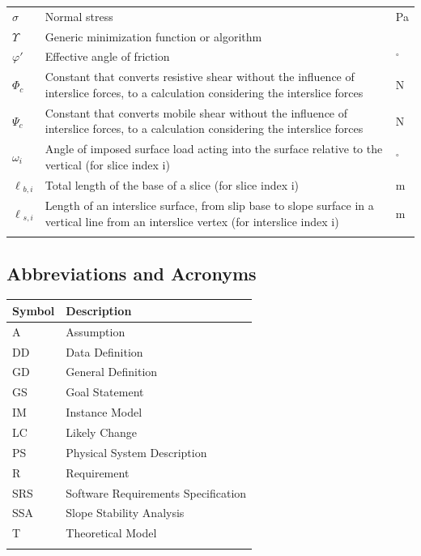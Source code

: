 \documentclass[12pt]{article}
\begin{document}
\begin{longtable*}{l l l}
\\
$\sigma{}$ & Normal stress & Pa
\\
$\Upsilon{}$ & Generic minimization function or algorithm & 
\\
$\varphi{}'$ & Effective angle of friction & ${}^{\circ}$
\\
$\Phi{}_{c}$ & Constant that converts resistive shear without the influence of interslice forces, to a calculation considering the interslice forces & N
\\
$\Psi{}_{c}$ & Constant that converts mobile shear without the influence of interslice forces, to a calculation considering the interslice forces & N
\\
$\omega{}_{i}$ & Angle of imposed surface load acting into the surface relative to the vertical (for slice index i) & ${}^{\circ}$
\\
$\ell{}_{b,i}$ & Total length of the base of a slice (for slice index i) & m
\\
$\ell{}_{s,i}$ & Length of an interslice surface, from slip base to slope surface in a vertical line from an interslice vertex (for interslice index i) & m
\\
\bottomrule
\label{Table:TablofSymb}
\end{longtable*}
\subsection{Abbreviations and Acronyms}
\label{Sec:AbbrandAcro}
\begin{longtable*}{l l}
\toprule
Symbol & Description
\\
\midrule
A & Assumption
\\
DD & Data Definition
\\
GD & General Definition
\\
GS & Goal Statement
\\
IM & Instance Model
\\
LC & Likely Change
\\
PS & Physical System Description
\\
R & Requirement
\\
SRS & Software Requirements Specification
\\
SSA & Slope Stability Analysis
\\
T & Theoretical Model
\\
\bottomrule
\label{Table:AbbrandAcro}
\end{longtable*}
\end{document}
